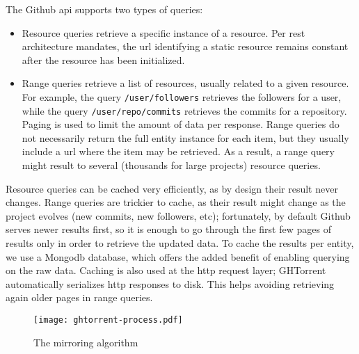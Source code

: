 \documentclass[conference]{IEEEtran}
\begin{document}
The Github {\sc api} supports two types of queries:

\begin{itemize}

  \item Resource queries retrieve a specific instance of a resource. Per 
    {\sc rest} architecture mandates, the {\sc url} identifying a static
    resource remains constant after the resource has been initialized. 

  \item Range queries retrieve a list of resources, usually related
    to a given resource. For example, the query \texttt{/user/followers} 
    retrieves the followers for a user, while the query
    \texttt{/user/repo/commits} retrieves the commits for a repository. Paging
    is used to limit the amount of data per response. Range queries do not
    necessarily return the full entity instance for each item, but they
    usually include a {\sc url} where the item may be retrieved. As a result,
    a range query might result to several (thousands for large projects) 
    resource queries.

\end{itemize}

Resource queries can be cached very efficiently, as by design their result never
changes. Range queries are trickier to cache, as their result might change as
the project evolves (new commits, new followers, etc); fortunately, by default
Github serves newer results first, so it is enough to go through the first few
pages of results only in order to retrieve the updated data. To cache the
results per entity, we use a Mongo{\sc db} database, which offers the added
benefit of enabling querying on the raw data. Caching is also used at the {\sc
http} request layer; GHTorrent automatically serializes {\sc http} responses to
disk. This helps avoiding retrieving again older pages in range queries.

\begin{figure}
  \begin{center}
    \texttt{[image: ghtorrent-process.pdf]}
  \end{center}
  \caption{The mirroring algorithm}
  \label{fig:mirror}
\end{figure}
\end{document}
